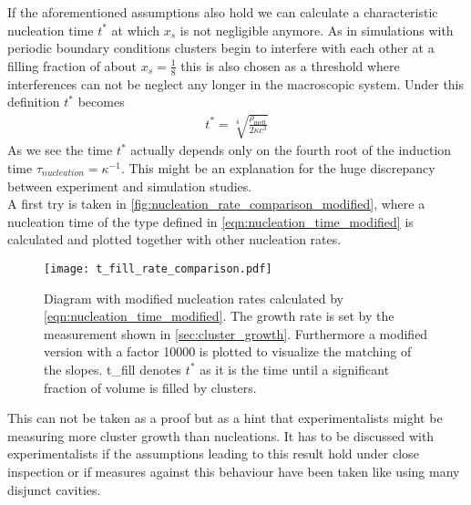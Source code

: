 If the aforementioned assumptions also hold we can calculate a characteristic nucleation time $t^*$ at which $x_s$ is not negligible anymore. As in simulations with periodic boundary conditions clusters begin to interfere with each other at a filling fraction of about $x_s=\frac{1}{8}$ this is also chosen as a threshold where interferences can not be neglect any longer in the macroscopic system. Under this definition $t^*$ becomes
\begin{align}
\label{eqn:nucleation_time_modified}
t^* = \sqrt[4]{\frac{\rho_{\text{melt}}}{2 \kappa c^3 }} 
\end{align}
As we see the time $t^*$ actually depends only on the fourth root of the induction time $\tau_{nucleation} = \kappa^{-1}$. This might be an explanation for the huge discrepancy between experiment and simulation studies.\\

A first try is taken in \autoref{fig:nucleation_rate_comparison_modified}, where a nucleation time of the type defined in \autoref{eqn:nucleation_time_modified} is calculated and plotted together with other nucleation rates.
\begin{figure}[h]
\centering
\texttt{[image: t\_fill\_rate\_comparison.pdf]}
\caption[Nucleation rate comparison under assumption of early filled boxes]{Diagram with modified nucleation rates calculated by \autoref{eqn:nucleation_time_modified}. The growth rate is set by the measurement shown in \autoref{sec:cluster_growth}. Furthermore a modified version with a factor 10000 is plotted to visualize the matching of the slopes. t\_fill denotes $t^*$ as it is the time until a significant fraction of volume is filled by clusters.}
\label{fig:nucleation_rate_comparison_modified}
\end{figure}
This can not be taken as a proof but as a hint that experimentalists might be measuring more cluster growth than nucleations. It has to be discussed with experimentalists if the assumptions leading to this result hold under close inspection or if measures against this behaviour have been taken like using many disjunct cavities.



